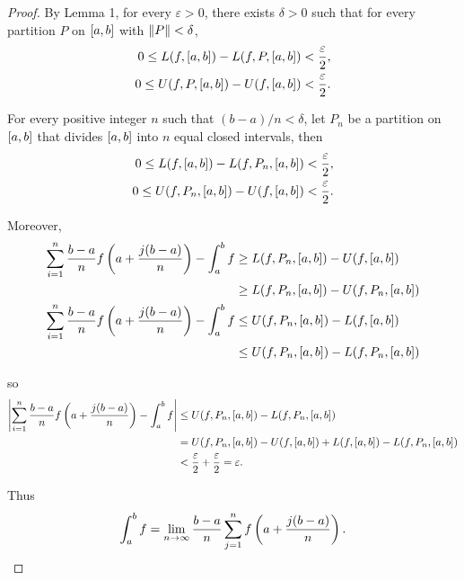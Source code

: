 \begin{proof}
    By Lemma 1, for every $\varepsilon > 0$, there exists $\delta > 0$ such that for every partition $P$ on $\left[{a, b}\right]$ with $\left\Vert{P}\right\Vert < \delta$,
    \[
        \begin{split}
            0\leq L(f, \left[{a, b}\right]) - L(f, P, \left[{a, b}\right]) < \frac{\varepsilon}{2}, \\
            0\leq U(f, P, \left[{a, b}\right]) - U(f, \left[{a, b}\right]) < \frac{\varepsilon}{2}.
        \end{split}
    \]

    For every positive integer $n$  such that $(b - a)/n < \delta$, let $P_{n}$ be a partition on $\left[{a, b}\right]$ that divides $\left[{a, b}\right]$ into $n$ equal closed intervals, then
    \[
        \begin{split}
            0\leq L(f, \left[{a, b}\right]) - L(f, P_{n}, \left[{a, b}\right]) < \frac{\varepsilon}{2}, \\
            0\leq U(f, P_{n}, \left[{a, b}\right]) - U(f, \left[{a, b}\right]) < \frac{\varepsilon}{2}.
        \end{split}
    \]

    Moreover,
    \begin{align*}
        \sum^{n}_{i=1}\frac{b-a}{n}f\left(a + \frac{j(b-a)}{n}\right) - \int^{b}_{a}f & \geq L(f, P_{n}, \left[{a, b}\right]) - U(f, \left[{a,b}\right])         \\
                                                                                      & \geq L(f, P_{n}, \left[{a, b}\right]) - U(f, P_{n}, \left[{a,b}\right])  \\
        \sum^{n}_{i=1}\frac{b-a}{n}f\left(a + \frac{j(b-a)}{n}\right) - \int^{b}_{a}f & \leq U(f, P_{n}, \left[{a, b}\right]) - L(f, \left[{a, b}\right])        \\
                                                                                      & \leq U(f, P_{n}, \left[{a, b}\right]) - L(f, P_{n}, \left[{a, b}\right])
    \end{align*}

    so
    \begin{align*}
        \left\vert{\sum^{n}_{i=1}\frac{b-a}{n}f\left(a + \frac{j(b-a)}{n}\right) - \int^{b}_{a}f}\right\vert & \leq U(f, P_{n}, \left[{a, b}\right]) - L(f, P_{n}, \left[{a, b}\right])                                                          \\
                                                                                            & = U(f, P_{n}, \left[{a, b}\right]) - U(f, \left[{a, b}\right]) + L(f, \left[{a, b}\right]) - L(f, P_{n}, \left[{a, b}\right]) \\
                                                                                            & < \frac{\varepsilon}{2} + \frac{\varepsilon}{2} = \varepsilon.
    \end{align*}

    Thus
    \[
        \int^{b}_{a}f = \lim\limits_{n\to\infty}\frac{b-a}{n}\sum^{n}_{j=1}f\left(a + \frac{j(b-a)}{n}\right).\qedhere
    \]
\end{proof}
\newpage

